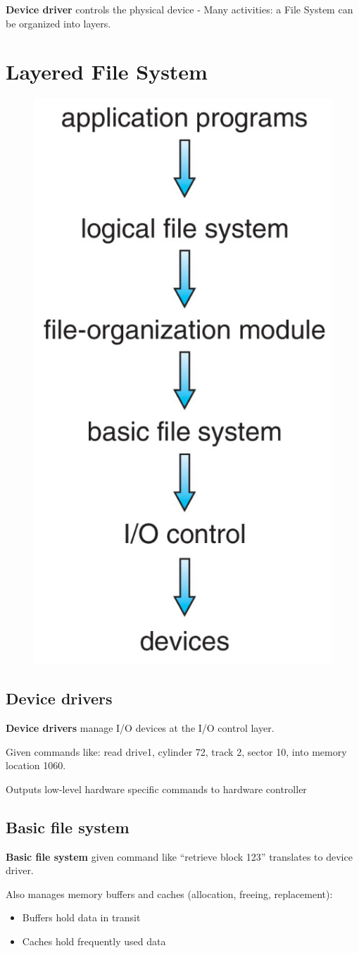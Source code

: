 \textbf{Device driver} controls the physical device - Many activities: a File System can be organized into layers.


\section{Layered File System}

\begin{figure}[h!]
    \centering
    \includegraphics[width=0.25\linewidth]{img/sdfrbn.png}
\end{figure}

\newpage
\subsection{Device drivers}

\textbf{Device drivers} manage I/O devices at the I/O control layer.


Given commands like: read drive1, cylinder 72, track 2, sector 10, into memory location 1060.


Outputs low-level hardware specific commands to hardware controller

\subsection{Basic file system }

\textbf{Basic file system} given command like “retrieve block 123” translates to device
driver.

Also manages memory buffers and caches (allocation, freeing, replacement):
\begin{itemize}
    \item Buffers hold data in transit
    \item Caches hold frequently used data
\end{itemize}





